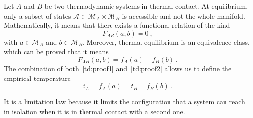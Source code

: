    \begin{law}[0th]
        Let $A$ and $B$ be two thermodynamic systems in thermal contact. At equilibrium, only a subset of states $\mathcal A \subset \mathcal M_A \times \mathcal M_B$ is accessible and not the whole manifold. Mathematically, it means that there exists a functional relation of the kind
        \begin{equation}\label{td:proof1}
            F_{AB} (a,b)= 0 ~,
        \end{equation}
        with $a \in \mathcal M_A$ and $b \in \mathcal M_B$. Moreover, thermal equilibrium is an equivalence class, which can be proved that it means 
        \begin{equation}\label{td:proof2}
            F_{AB} (a,b) = f_A(a) - f_B(b) ~.
        \end{equation}
        The combination of both~\eqref{td:proof1} and~\eqref{td:proof2} allows us to define the empirical temperature 
        \begin{equation}\label{td:0th}
            t_A = f_A(a) = t_B = f_B(b) ~.
        \end{equation}
    \end{law}
    \noindent It is a limitation law because it limits the configuration that a system can reach in isolation when it is in thermal contact with a second one. 

